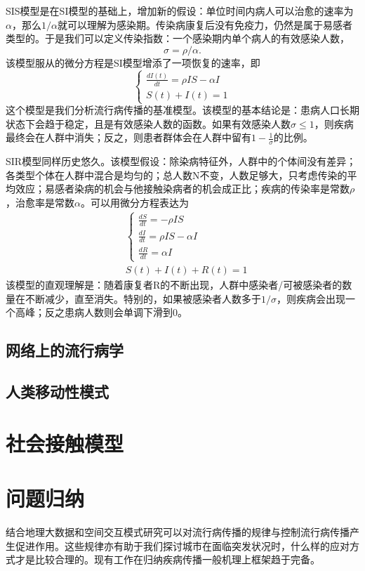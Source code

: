 SIS模型是在SI模型的基础上，增加新的假设：单位时间内病人可以治愈的速率为$\alpha$，那么$1/\alpha$就可以理解为感染期。传染病康复后没有免疫力，仍然是属于易感者类型的。于是我们可以定义传染指数：一个感染期内单个病人的有效感染人数，\[\sigma = \rho/\alpha.\]该模型服从的微分方程是SI模型增添了一项恢复的速率，即\begin{equation}
    \left\{\begin{array}{l}
    {\frac{d I(t)}{d t}=\rho I S-\alpha I} \\
    {S(t)+I(t)=1}
    \end{array}\right.
    \end{equation}
这个模型是我们分析流行病传播的基准模型。该模型的基本结论是：患病人口长期状态下会趋于稳定，且是有效感染人数的函数。如果有效感染人数$\sigma\le 1$，则疾病最终会在人群中消失；反之，则患者群体会在人群中留有$1-\frac{1}{\sigma}$的比例。

SIR模型同样历史悠久\cite{kermack1927contribution}。该模型假设：除染病特征外，人群中的个体间没有差异；各类型个体在人群中混合是均匀的；总人数N不变，人数足够大，只考虑传染的平均效应；易感者染病的机会与他接触染病者的机会成正比；疾病的传染率是常数$\rho$，治愈率是常数$\alpha$。可以用微分方程表达为
\begin{equation}
    \begin{aligned}
    &\left\{\begin{array}{l}
    {\frac{d S}{d t}=-\rho I S} \\
    {\frac{d I}{d t}=\rho I S-\alpha I} \\
    {\frac{d R}{d t}=\alpha I}
    \end{array}\right.\\
    &S(t)+I(t)+R(t)=1
    \end{aligned}
\end{equation}
该模型的直观理解是：随着康复者R的不断出现，人群中感染者/可被感染者的数量在不断减少，直至消失。特别的，如果被感染者人数多于$1/\sigma$，则疾病会出现一个高峰；反之患病人数则会单调下滑到$0$。

\subsection{网络上的流行病学}

\subsection{人类移动性模式}

\section{社会接触模型}

\section{问题归纳}

结合地理大数据和空间交互模式研究可以对流行病传播的规律与控制流行病传播产生促进作用。这些规律亦有助于我们探讨城市在面临突发状况时，什么样的应对方式才是比较合理的。现有工作在归纳疾病传播一般机理上框架趋于完备。
